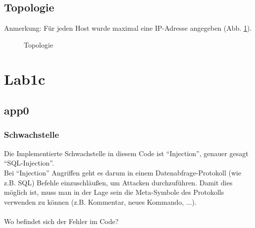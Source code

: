 \documentclass[12pt,a4paper,titlepage,oneside]{scrartcl}
\begin{document}
\subsection{Topologie}
Anmerkung: Für jeden Host wurde maximal eine IP-Adresse angegeben (Abb. \ref*{fig:topology}).
\begin{figure}[h!]
	\centering
	\caption{Topologie}
	\label{fig:topology}
\end{figure}

\section{Lab1c}

\subsection{app0}

\subsubsection{Schwachstelle}

Die Implementierte Schwachstelle in diesem Code ist "`Injection"', genauer gesagt "`SQL-Injection"'. \\
Bei "`Injection"' Angriffen geht es darum in einem Datenabfrage-Protokoll (wie z.B. SQL) Befehle einzuschläußen, um Attacken durchzuführen. Damit dies möglich ist, muss man in der Lage sein die Meta-Symbole des Protokolls verwenden zu können (z.B. Kommentar, neues Kommando, ...). \\
\\
Wo befindet sich der Fehler im Code?
\end{document}
